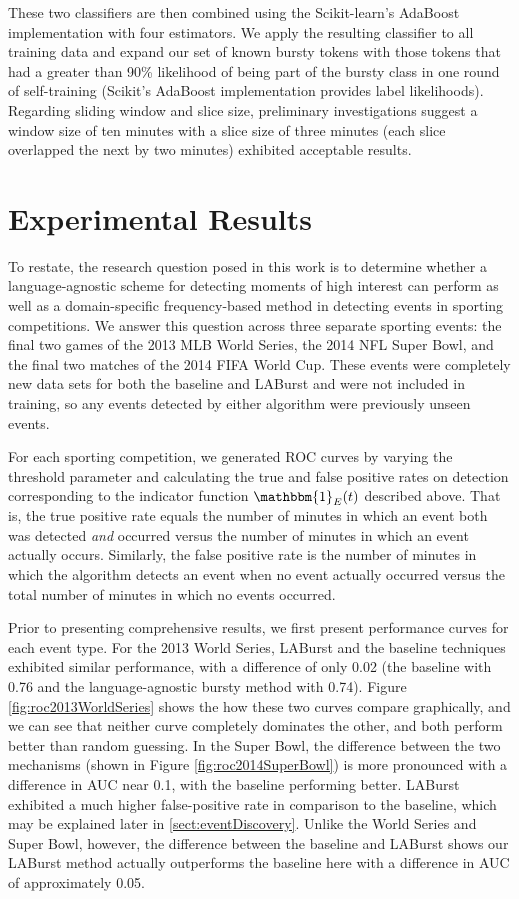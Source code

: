 \documentclass{sig-alternate}
\begin{document}
These two classifiers are then combined using the Scikit-learn's AdaBoost implementation with four estimators.
We apply the resulting classifier to all training data and expand our set of known bursty tokens with those tokens that had a greater than 90\% likelihood of being part of the bursty class in one round of self-training (Scikit's AdaBoost implementation provides label likelihoods).
Regarding sliding window and slice size, preliminary investigations suggest a window size of ten minutes with a slice size of three minutes (each slice overlapped the next by two minutes) exhibited acceptable results.

\section{Experimental Results}
\label{sect:results}

To restate, the research question posed in this work is to determine whether a language-agnostic scheme for detecting moments of high interest can perform as well as a domain-specific frequency-based method in detecting events in sporting competitions.
We answer this question across three separate sporting events: the final two games of the 2013 MLB World Series, the 2014 NFL Super Bowl, and the final two matches of the 2014 FIFA World Cup.
These events were completely new data sets for both the baseline and LABurst and were not included in training, so any events detected by either algorithm were previously unseen events.

For each sporting competition, we generated ROC curves by varying the threshold parameter and calculating the true and false positive rates on detection corresponding to the indicator function $\mathbbm{1}_E(t)$ described above.
That is, the true positive rate equals the number of minutes in which an event both was detected \emph{and} occurred versus the number of minutes in which an event actually occurs.
Similarly, the false positive rate is the number of minutes in which the algorithm detects an event when no event actually occurred versus the total number of minutes in which no events occurred.

Prior to presenting comprehensive results, we first present performance curves for each event type.
For the 2013 World Series, LABurst and the baseline techniques exhibited similar performance, with a difference of only 0.02 (the baseline with 0.76 and the language-agnostic bursty method with 0.74).
Figure \ref{fig:roc2013WorldSeries} shows the how these two curves compare graphically, and we can see that neither curve completely dominates the other, and both perform better than random guessing.
In the Super Bowl, the difference between the two mechanisms (shown in Figure \ref{fig:roc2014SuperBowl}) is more pronounced with a difference in AUC near 0.1, with the baseline performing better.
LABurst exhibited a much higher false-positive rate in comparison to the baseline, which may be explained later in \ref{sect:eventDiscovery}.
Unlike the World Series and Super Bowl, however, the difference between the baseline and LABurst shows our LABurst method actually outperforms the baseline here with a difference in AUC of approximately 0.05.
\end{document}
